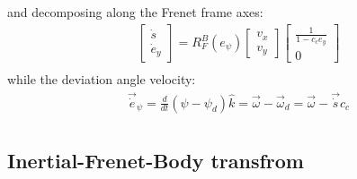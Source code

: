 \documentclass[12pt]{article}
\begin{document}
            and decomposing along the Frenet frame axes:
            \begin{equation}
                \label{curvilinear dynamics}
                \begin{aligned}
                    & \begin{bmatrix} \dot{s} \\ \dot{e}_y \end{bmatrix} 
                    = 
                    R^B_F(e_{\psi}) \begin{bmatrix} v_x \\ v_y \end{bmatrix} \begin{bmatrix} \frac{1}{1 - c_c e_y} \\ 0 \end{bmatrix} \\
                \end{aligned}
            \end{equation}
            while the deviation angle velocity:
            \begin{equation}
                \label{curvilinear deviation}
                \begin{aligned}
                    & \vec{\dot{e}}_{\psi} = \frac{d}{dt} (\psi - \psi_d) \hat{k} = \vec{\omega} - \vec{\omega}_d = \vec{\omega} - \vec{\dot{s}} c_c \\
                \end{aligned}
            \end{equation}







        \newpage





    \subsection{Inertial-Frenet-Body transfrom}
\end{document}
